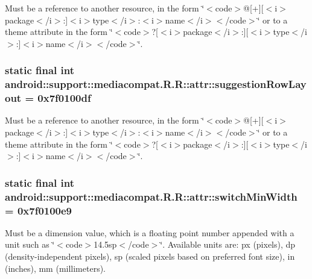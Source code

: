 Must be a reference to another resource, in the form \char`\"{}$<$code$>$@\mbox{[}+\mbox{]}\mbox{[}$<$i$>$package$<$/i$>$:\mbox{]}$<$i$>$type$<$/i$>$:$<$i$>$name$<$/i$>$$<$/code$>$\char`\"{} or to a theme attribute in the form \char`\"{}$<$code$>$?\mbox{[}$<$i$>$package$<$/i$>$:\mbox{]}\mbox{[}$<$i$>$type$<$/i$>$:\mbox{]}$<$i$>$name$<$/i$>$$<$/code$>$\char`\"{}. \hypertarget{classandroid_1_1support_1_1mediacompat_1_1_r_1_1attr_63b5f38d06bb08f5b12ad8a235f543d4}{
\subsubsection[{suggestionRowLayout}]{\setlength{\rightskip}{0pt plus 5cm}static final int android::support::mediacompat.R.R::attr::suggestionRowLayout = 0x7f0100df}}
\label{classandroid_1_1support_1_1mediacompat_1_1_r_1_1attr_63b5f38d06bb08f5b12ad8a235f543d4}


Must be a reference to another resource, in the form \char`\"{}$<$code$>$@\mbox{[}+\mbox{]}\mbox{[}$<$i$>$package$<$/i$>$:\mbox{]}$<$i$>$type$<$/i$>$:$<$i$>$name$<$/i$>$$<$/code$>$\char`\"{} or to a theme attribute in the form \char`\"{}$<$code$>$?\mbox{[}$<$i$>$package$<$/i$>$:\mbox{]}\mbox{[}$<$i$>$type$<$/i$>$:\mbox{]}$<$i$>$name$<$/i$>$$<$/code$>$\char`\"{}. \hypertarget{classandroid_1_1support_1_1mediacompat_1_1_r_1_1attr_97a13eff50ce3da41332ae2809e04666}{
\subsubsection[{switchMinWidth}]{\setlength{\rightskip}{0pt plus 5cm}static final int android::support::mediacompat.R.R::attr::switchMinWidth = 0x7f0100e9}}
\label{classandroid_1_1support_1_1mediacompat_1_1_r_1_1attr_97a13eff50ce3da41332ae2809e04666}


Must be a dimension value, which is a floating point number appended with a unit such as \char`\"{}$<$code$>$14.5sp$<$/code$>$\char`\"{}. Available units are: px (pixels), dp (density-independent pixels), sp (scaled pixels based on preferred font size), in (inches), mm (millimeters). 

